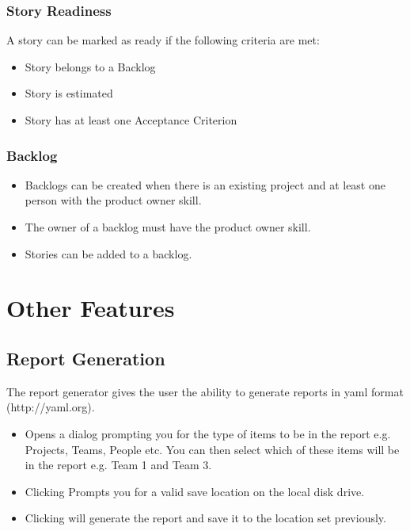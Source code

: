 \documentclass[11pt,fleqn]{book} %
\begin{document}
\subsection{Story Readiness}
A story can be marked as ready if the following criteria are met:
\begin{itemize}
\item Story belongs to a Backlog
\item Story is estimated
\item Story has at least one Acceptance Criterion
\end{itemize}

\subsection{Backlog}

\begin{itemize}
\item Backlogs can be created when there is an existing project and at least one person with the product owner skill.
\item The owner of a backlog must have the product owner skill. 
\item Stories can be added to a backlog.
\end{itemize}

\chapter{Other Features}
\section{Report Generation}
The report generator gives the user the ability to generate reports in yaml format (http://yaml.org).
\begin{itemize}
  \item {} Opens a dialog prompting you for the type of items to be in the report
  e.g. Projects, Teams, People etc. You can then select which of these items will be in the report e.g. Team 1 and
  Team 3.
  \item Clicking  Prompts you for a valid save location on the local disk drive.
  \item Clicking  will generate the report and save it to the location set previously.
\end{itemize}
\end{document}
